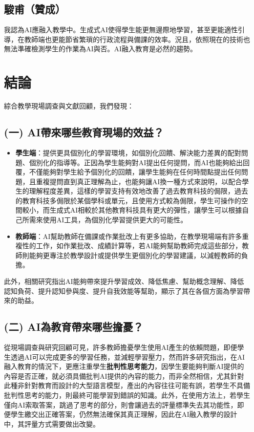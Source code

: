 \subsection{駿甫（贊成）}\label{sec:駿甫}

我認為AI應融入教學中。生成式AI使得學生能更無邊際地學習，甚至更能適性引導，在教師端也更能節省繁瑣的行政流程與備課的效率。況且，依照現在的技術也無法準確檢測學生的作業為AI與否。AI融入教育是必然的趨勢。

\section{結論}\label{sec:結論}

綜合教學現場調查與文獻回顧，我們發現：

\subsection{(一) AI帶來哪些教育現場的效益？}\label{sec:結論一}

\begin{itemize}
    \item \textbf{學生端}：提供更具個別化的學習環境，如個別化回饋、解決能力差異的配對問題、個別化的指導等。正因為學生能夠對AI提出任何提問，而AI也能夠給出回覆，不僅能夠對學生給予個別化的回饋，讓學生能夠在任何時間點提出任何問題，且重複提問直到真正理解為止，也能夠讓AI換一種方式來說明，以配合學生的理解程度差異，這樣的學習支持有效地改善了過去教育科技的侷限，過去的教育科技多侷限於某個學科或單元，且使用方式較為侷限，學生可操作的空間較小，而生成式AI相較於其他教育科技具有更大的彈性，讓學生可以根據自己所需來使用AI工具，為個別化學習提供更大的可能性。

    \item \textbf{教師端}：AI幫助教師在備課或作業批改上有更多協助，在教學現場端有許多重複性的工作，如作業批改、成績計算等，若AI能夠幫助教師完成這些部分，教師則能夠更專注於教學設計或提供學生更個別化的學習建議，以減輕教師的負擔。
\end{itemize}

此外，相關研究指出AI能夠帶來提升學習成效、降低焦慮、幫助概念理解、降低認知負荷、提升認知參與度、提升自我效能等幫助，顯示了其在各個方面為學習帶來的助益。

\subsection{(二) AI為教育帶來哪些擔憂？}\label{sec:結論二}

從現場調查與研究回顧可見，許多教師擔憂學生使用AI產生的依賴問題，即便學生透過AI可以完成更多的學習任務，並減輕學習壓力，然而許多研究指出，在AI融入教育的情況下，更應注重學生\textbf{批判性思考能力}，因學生要能夠判斷AI提供的內容是否正確，就必須具備批判AI提供的內容的能力，而非全然相信，尤其針對此種非針對教育而設計的大型語言模型，產出的內容往往可能有誤，若學生不具備批判性思考的能力，則最終可能學習到錯誤的知識。此外，在使用方法上，若學生僅向AI索取答案，跳過了思考的部分，則會讓過去的評量標準失去其功能性，即便學生繳交出正確答案，仍然無法確保其真正理解，因此在AI融入教學的設計中，其評量方式需要做出改變。

